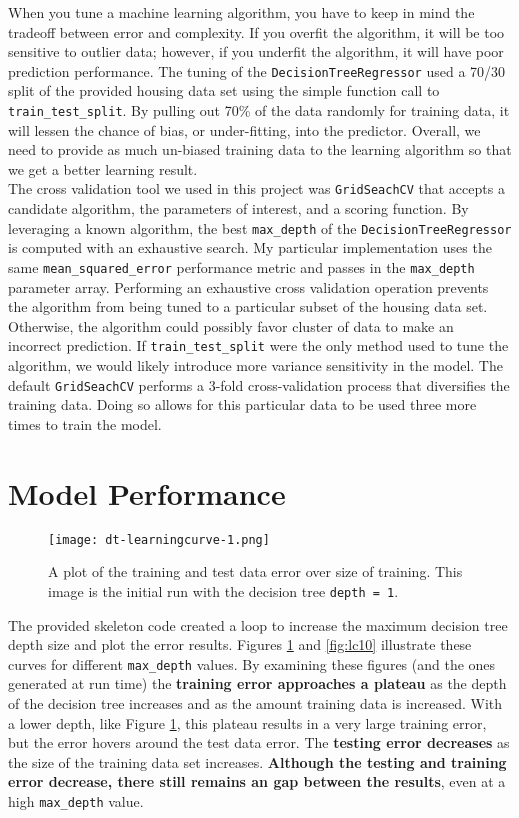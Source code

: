 \documentclass[12pt,letterpaper]{article}
\begin{document}
When you tune a machine learning algorithm, you have to keep in mind the tradeoff between error and complexity.
If you overfit the algorithm, it will be too sensitive to outlier data; however, if you underfit the algorithm, it will have poor prediction performance.
The tuning of the \texttt{DecisionTreeRegressor} used a 70/30 split of the provided housing data set using the simple function call to \verb|train_test_split|.
By pulling out 70\% of the data randomly for training data, it will lessen the chance of bias, or under-fitting, into the predictor.
Overall, we need to provide as much un-biased training data to the learning algorithm so that we get a better learning result.
\\

The cross validation tool we used in this project was \verb|GridSeachCV| that accepts a candidate algorithm, the parameters of interest, and a scoring function.
By leveraging a known algorithm, the best \verb|max_depth| of the \verb|DecisionTreeRegressor| is computed with an exhaustive search.
My particular implementation uses the same \verb|mean_squared_error| performance metric and passes in the \verb|max_depth| parameter array.
Performing an exhaustive cross validation operation prevents the algorithm from being tuned to a particular subset of the housing data set.
Otherwise, the algorithm could possibly favor cluster of data to make an incorrect prediction.
If \verb|train_test_split| were the only method used to tune the algorithm, we would likely introduce more variance sensitivity in the model.
The default \verb|GridSeachCV| performs a 3-fold cross-validation process that diversifies the training data.
Doing so allows for this particular data to be used three more times to train the model.

\section*{Model Performance}

\begin{figure}[h!]
	\centering
	\texttt{[image: dt-learningcurve-1.png]}
	\caption{A plot of the training and test data error over size of training. This image is the initial run with the decision tree \texttt{depth = 1}.}
	\label{fig:lc1}
\end{figure}

The provided skeleton code created a loop to increase the maximum decision tree depth size and plot the error results. 
Figures \ref{fig:lc1} and \ref{fig:lc10} illustrate these curves for different \verb|max_depth| values.
By examining these figures (and the ones generated at run time) the {\bf training error approaches a plateau} as the depth of the decision tree increases and as the amount training data is increased.
With a lower depth, like Figure \ref{fig:lc1}, this plateau results in a very large training error, but the error hovers around the test data error.
The {\bf testing error decreases} as the size of the training data set increases.
{\bf Although the testing and training error decrease, there still remains an gap between the results}, even at a high \verb|max_depth| value. \\
\end{document}
